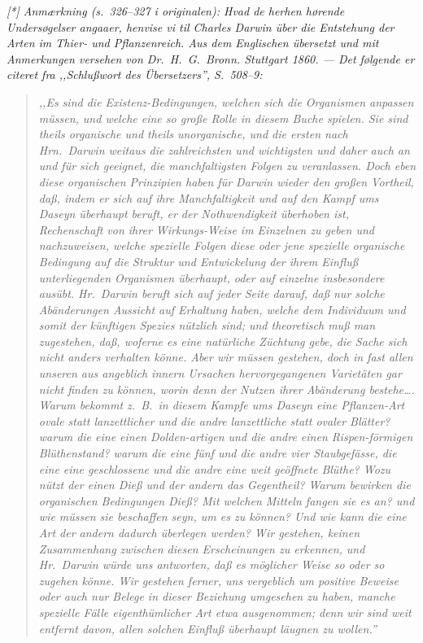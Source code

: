 \documentclass[12pt,a4paper]{article}
\begin{document}
\medskip
\noindent\textit{[*] Anmærkning (s.\ 326--327 i originalen):
Hvad de herhen hørende Undersøgelser angaaer, henvise vi til
Charles Darwin \emph{über die Entstehung der Arten im Thier- und
Pflanzenreich.} Aus dem Englischen übersetzt und mit Anmerkungen
versehen von Dr.\ H.\ G.\ Bronn. Stuttgart 1860. --- Det følgende
er citeret fra \emph{,,Schlußwort des Übersetzers''}, S.\ 508--9:}

\begin{quote}
\itshape
,,Es sind die Existenz-Bedingungen, welchen sich die Organismen
anpassen müssen, und welche eine so große Rolle in diesem Buche
spielen. Sie sind theils organische und theils unorganische, und
die ersten nach Hrn.\ Darwin weitaus die zahlreichsten und
wichtigsten und daher auch an und für sich geeignet, die
manchfaltigsten Folgen zu veranlassen. Doch eben diese organischen
Prinzipien haben für Darwin wieder den großen Vortheil, daß,
indem er sich auf ihre Manchfaltigkeit und auf den Kampf ums
Daseyn überhaupt beruft, er der Nothwendigkeit überhoben ist,
Rechenschaft von ihrer Wirkungs-Weise im Einzelnen zu geben und
nachzuweisen, welche spezielle Folgen diese oder jene spezielle
organische Bedingung auf die Struktur und Entwickelung der ihrem
Einfluß unterliegenden Organismen überhaupt, oder auf einzelne
insbesondere ausübt. Hr.\ Darwin beruft sich auf jeder Seite
darauf, daß nur solche Abänderungen Aussicht auf Erhaltung haben,
welche dem Individuum und somit der künftigen Spezies nützlich
sind; und theoretisch muß man zugestehen, daß, woferne es eine
natürliche Züchtung gebe, die Sache sich nicht anders verhalten
könne. Aber wir müssen gestehen, doch in fast allen unseren aus
angeblich innern Ursachen hervorgegangenen Varietäten gar nicht
finden zu können, worin denn der Nutzen ihrer Abänderung
bestehe\ldots. Warum bekommt z.\ B.\ in diesem Kampfe ums Daseyn
eine Pflanzen-Art ovale statt lanzettlicher und die andre
lanzettliche statt ovaler Blätter? warum die eine einen
Dolden-artigen und die andre einen Rispen-förmigen Blüthenstand?
warum die eine fünf und die andre vier Staubgefässe, die eine
eine geschlossene und die andre eine weit geöffnete Blüthe? Wozu
nützt der einen Dieß und der andern das Gegentheil? Warum
bewirken die organischen Bedingungen Dieß? Mit welchen Mitteln
fangen sie es an? und wie müssen sie beschaffen seyn, um es zu
können? Und wie kann die eine Art der andern dadurch überlegen
werden? Wir gestehen, keinen Zusammenhang zwischen diesen
Erscheinungen zu erkennen, und Hr.\ Darwin würde uns antworten,
daß es möglicher Weise so oder so zugehen könne. Wir gestehen
ferner, uns vergeblich um positive Beweise oder auch nur Belege
in dieser Beziehung umgesehen zu haben, manche spezielle Fälle
eigenthümlicher Art etwa ausgenommen; denn wir sind weit entfernt
davon, allen solchen Einfluß überhaupt läugnen zu wollen.''
\end{quote}
\end{document}
